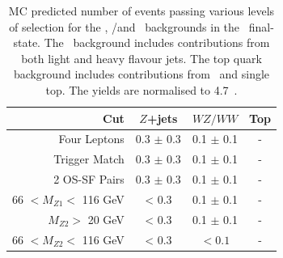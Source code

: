 \begin{table}[htbp]
  \centering
  \begin{tabular}{r|c|c|c} 
    \hline\hline
                 Cut &               $Z$+jets &             $WZ/WW$ &               Top\\ 
    \hline

        Four Leptons        &  0.3 $\pm$ 0.3 & 0.1 $\pm$ 0.1    & - \\ 
       Trigger Match        &  0.3 $\pm$ 0.3 & 0.1 $\pm$ 0.1    & - \\ 
       2 OS-SF Pairs        &  0.3 $\pm$ 0.3 & 0.1 $\pm$ 0.1    & - \\ 
66 $ < M_{Z1} < $ 116 GeV   &  < 0.3         & 0.1 $\pm$ 0.1    & - \\ 
  $M_{Z2} > $ 20 GeV        &  < 0.3         & 0.1 $\pm$ 0.1    & - \\ 
66 $ < M_{Z2} < $ 116 GeV   &  < 0.3         & $<0.1$           & - \\ 
    \hline\hline
  \end{tabular}
  \caption[MC predicted number of events passing various levels of selection for
  the \Zjets, \WZ/\WW and \topquark\ backgrounds in the  \mmmm\ final-state.]
  {MC predicted number of events passing various levels of selection for
  the \Zjets, \WZ/\WW and \topquark\ backgrounds in the \mmmm\ final-state. The
  \Zjets\ background includes contributions from both light and heavy flavour
  jets. The top quark background includes contributions from \ttbar\ and
  single top. The yields are normalised to 4.7~\ifb.
  }
  \label{table:mc-bg-4mu}
\end{table}

